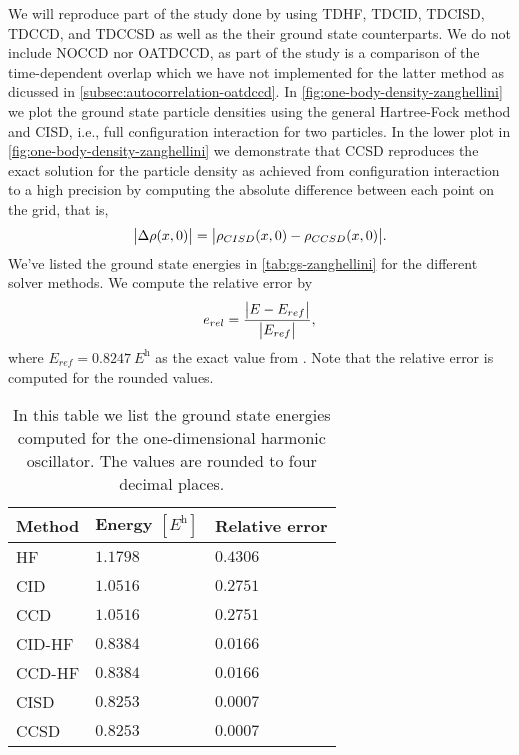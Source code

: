         We will reproduce part of the study done by
        \citeauthor{zanghellini_2004} using TDHF, TDCID, TDCISD, TDCCD, and
        TDCCSD as well as the their ground state counterparts.
        We do not include NOCCD nor OATDCCD, as part of the study is a
        comparison of the time-dependent overlap which we have not implemented
        for the latter method as dicussed in
        \autoref{subsec:autocorrelation-oatdccd}.
        In \autoref{fig:one-body-density-zanghellini} we plot the ground state
        particle densities using the general Hartree-Fock method and CISD, i.e.,
        full configuration interaction for two particles.
        In the lower plot in \autoref{fig:one-body-density-zanghellini} we
        demonstrate that CCSD reproduces the exact solution for the particle
        density as achieved from configuration interaction to a high precision
        by computing the absolute difference between each point on the grid,
        that is,
        \begin{align}
            \abs{\Delta \rho(x, 0)}
            = \abs{\rho_{CISD}(x, 0) - \rho_{CCSD}(x, 0)}.
        \end{align}
        We've listed the ground state energies in \autoref{tab:gs-zanghellini}
        for the different solver methods.
        We compute the relative error by
        \begin{align}
            e_{rel} = \frac{\abs{E - E_{ref}}}{\abs{E_{ref}}},
        \end{align}
        where $E_{ref} = \SI{0.8247}{\hartree}$ as the exact value from
        \citeauthor{zanghellini_2004} \cite{zanghellini_2004}.
        Note that the relative error is computed for the rounded values.

        \begin{table}
            \centering
            \caption{In this table we list the ground state energies computed
            for the one-dimensional harmonic oscillator.
            The values are rounded to four decimal places.}
            \renewcommand{\arraystretch}{1.3}
            \begin{tabular}{@{}lll@{}}
                \toprule
                Method & Energy $[\si{\hartree}]$
                & Relative error \\
                \midrule
                HF     & $1.1798$ & $0.4306$ \\
                CID    & $1.0516$ & $0.2751$ \\
                CCD    & $1.0516$ & $0.2751$ \\
                CID-HF & $0.8384$ & $0.0166$ \\
                CCD-HF & $0.8384$ & $0.0166$ \\
                CISD   & $0.8253$ & $0.0007$ \\
                CCSD   & $0.8253$ & $0.0007$ \\
                \bottomrule
            \end{tabular}
            \label{tab:gs-zanghellini}
        \end{table}

